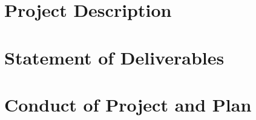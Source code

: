 \section{Project Description} \label{reqProDes}

\section{Statement of Deliverables} \label{reqDel}

\section{Conduct of Project and Plan} \label{reqConProPln}

